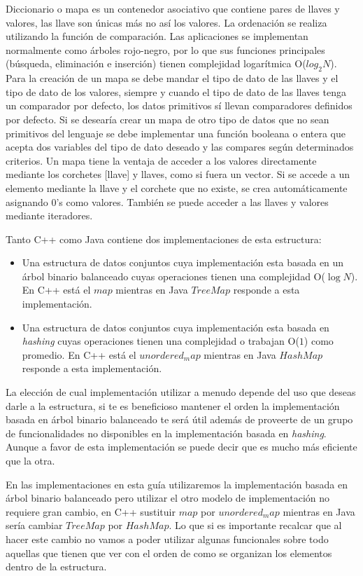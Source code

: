 Diccionario o mapa es un contenedor asociativo que contiene pares de llaves y valores, las llave son únicas más no
así los valores. La ordenación se realiza utilizando la función de comparación. Las aplicaciones se
implementan normalmente como árboles rojo-negro, por lo que sus funciones principales (búsqueda,
eliminación e inserción) tienen complejidad logarítmica O($log_2 N$). Para la creación de un mapa se debe mandar el tipo de dato de las llaves y el tipo de dato de los
valores, siempre y cuando el tipo de dato de las llaves tenga un comparador por defecto, los datos
primitivos sí llevan comparadores definidos por defecto. Si se desearía crear un mapa de otro tipo de datos que no sean primitivos del lenguaje se debe implementar una función booleana o entera que acepta dos variables del tipo de dato deseado y las compares según determinados criterios. Un mapa tiene la ventaja de acceder a los valores directamente mediante los corchetes [llave] y
llaves, como si fuera un vector. Si se accede a un elemento mediante la llave y el corchete que no
existe, se crea automáticamente asignando 0’s como valores. También se puede acceder a las llaves y valores mediante iteradores.


Tanto C++ como Java contiene dos implementaciones de esta estructura: 

\begin{itemize}
	\item Una estructura de datos conjuntos cuya implementación esta basada en un árbol binario balanceado cuyas operaciones tienen una complejidad O($\log N$). En C++ está el $map$ mientras en Java $TreeMap$ responde a esta implementación.
	\item Una estructura de datos conjuntos cuya implementación esta basada en \emph{hashing} cuyas operaciones tienen una complejidad o trabajan O($1$) como promedio. En C++ está el $unordered_map$ mientras en Java $HashMap$ responde a esta implementación.
\end{itemize}

La elección de cual implementación utilizar a menudo depende del uso que deseas darle a la estructura, si te es beneficioso mantener el orden la implementación basada en árbol binario balanceado te será útil además de proveerte de un grupo de funcionalidades no disponibles en la implementación basada en \emph{hashing}. Aunque a favor de esta implementación se puede decir que es mucho más eficiente que la otra. 

En las implementaciones en esta guía utilizaremos la implementación basada en árbol binario balanceado pero utilizar el otro modelo de implementación no requiere gran cambio, en C++ sustituir $map$ por $unordered_map$ mientras en Java sería cambiar $TreeMap$ por $HashMap$. Lo que si es importante recalcar que al hacer este cambio no vamos a poder utilizar algunas funcionales sobre todo aquellas que tienen que ver con el orden de como se organizan los elementos dentro de la estructura. 

